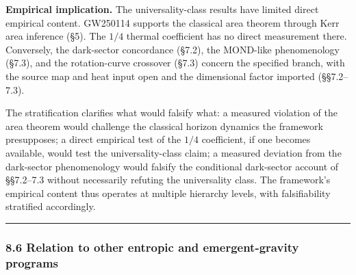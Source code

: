 \documentclass[
]{article}
\begin{document}
\textbf{Empirical implication.} The universality-class results have
limited direct empirical content. GW250114 supports the classical area
theorem through Kerr area inference (§5). The \(1/4\) thermal
coefficient has no direct measurement there. Conversely, the dark-sector
concordance (§7.2), the MOND-like phenomenology (§7.3), and the
rotation-curve crossover (§7.3) concern the specified branch, with the
source map and heat input open and the dimensional factor imported
(§§7.2--7.3).

The stratification clarifies what would falsify what: a measured
violation of the area theorem would challenge the classical horizon
dynamics the framework presupposes; a direct empirical test of the
\(1/4\) coefficient, if one becomes available, would test the
universality-class claim; a measured deviation from the dark-sector
phenomenology would falsify the conditional dark-sector account of
§§7.2--7.3 without necessarily refuting the universality class. The
framework's empirical content thus operates at multiple hierarchy
levels, with falsifiability stratified accordingly.

\begin{center}\rule{0.5\linewidth}{0.5pt}\end{center}

\hypertarget{relation-to-other-entropic-and-emergent-gravity-programs}{%
\subsubsection{8.6 Relation to other entropic and emergent-gravity
programs}\label{relation-to-other-entropic-and-emergent-gravity-programs}}
\end{document}
